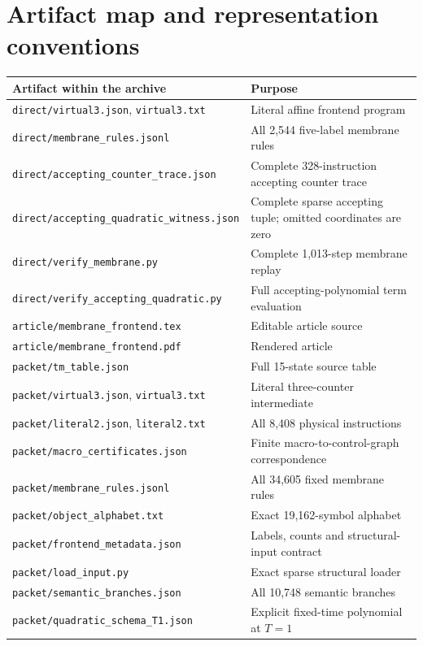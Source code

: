 \documentclass[11pt,letterpaper]{article}
\theoremstyle{definition}
\theoremstyle{remark}
\newcommand{\file}[1]{\nolinkurl{#1}}
\begin{document}
\section{Artifact map and representation conventions}\label{qoc:um:app:artifacts}
\begin{longtable}{@{}>{\raggedright\arraybackslash}p{}>{\raggedright\arraybackslash}p{}@{}}
\toprule
Artifact within the archive & Purpose\\\midrule\endhead
\file{direct/virtual3.json}, \file{virtual3.txt} & Literal affine frontend program\\
\file{direct/membrane_rules.jsonl} & All 2,544 five-label membrane rules\\
\file{direct/accepting_counter_trace.json} & Complete 328-instruction accepting counter trace\\
\file{direct/accepting_quadratic_witness.json} & Complete sparse accepting tuple; omitted coordinates are zero\\
\file{direct/verify_membrane.py} & Complete 1,013-step membrane replay\\
\file{direct/verify_accepting_quadratic.py} & Full accepting-polynomial term evaluation\\
\file{article/membrane_frontend.tex} & Editable article source\\
\file{article/membrane_frontend.pdf} & Rendered article\\
\file{packet/tm_table.json} & Full 15-state source table\\
\file{packet/virtual3.json}, \file{virtual3.txt} & Literal three-counter intermediate\\
\file{packet/literal2.json}, \file{literal2.txt} & All 8,408 physical instructions\\
\file{packet/macro_certificates.json} & Finite macro-to-control-graph correspondence\\
\file{packet/membrane_rules.jsonl} & All 34,605 fixed membrane rules\\
\file{packet/object_alphabet.txt} & Exact 19,162-symbol alphabet\\
\file{packet/frontend_metadata.json} & Labels, counts and structural-input contract\\
\file{packet/load_input.py} & Exact sparse structural loader\\
\file{packet/semantic_branches.json} & All 10,748 semantic branches\\
\file{packet/quadratic_schema_T1.json} & Explicit fixed-time polynomial at $T=1$\\

\end{longtable}
\end{document}
